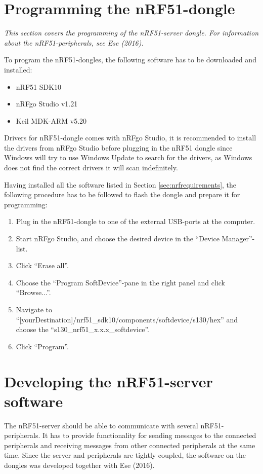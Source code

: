 \section{Programming the nRF51-dongle}
\textit{This section covers the programming of the nRF51-server dongle. For information about the nRF51-peripherals, see Ese (2016).}

\label{sec:nrfrequirements}
To program the nRF51-dongles, the following software has to be downloaded and installed:
\begin{itemize}
    \item nRF51 SDK10\cite{nrf51sdk}
    \item nRFgo Studio v1.21\cite{nrfgo}
    \item Keil MDK-ARM v5.20\cite{keil}
\end{itemize}
Drivers for nRF51-dongle comes with nRFgo Studio, it is recommended to install the drivers from nRFgo Studio before plugging in the nRF51 dongle since Windows will try to use Windows Update to search for the drivers, as Windows does not find the correct drivers it will scan indefinitely.

Having installed all the software listed in Section \ref{sec:nrfrequirements}, the following procedure has to be followed to flash the dongle and prepare it for programming:
\begin{enumerate}
    \item Plug in the nRF51-dongle to one of the external USB-ports at the computer.
    \item Start nRFgo Studio, and choose the desired device in the ``Device Manager''-list.
    \item Click ``Erase all''.
    \item Choose the ``Program SoftDevice''-pane in the right panel and click ``Browse...''.
    \item Navigate to ``[yourDestination]/nrf51\_sdk10/components/softdevice/s130/hex'' and choose the ``s130\_nrf51\_x.x.x\_softdevice''.
    \item Click ``Program''.
\end{enumerate}

\section{Developing the nRF51-server software}
The nRF51-server should be able to communicate with several nRF51-peripherals. It has to provide functionality for sending messages to the connected peripherals and receiving messages from other connected peripherals at the same time. Since the server and peripherals are tightly coupled, the software on the dongles was developed together with Ese (2016).

